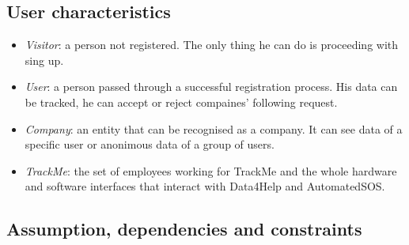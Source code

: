 \documentclass{article}
\begin{document}
\subsection{User characteristics}
\begin{itemize}
\item \emph{Visitor}: a person not registered. The only thing he can do is proceeding with sing up.
\item \emph{User}: a person passed through a successful registration process. His data can be tracked, he can accept or reject compaines' following request.
 \item \emph{Company}: an entity that can be recognised as a company. It can see data of a specific user or anonimous data of a group of users. 
 \item \emph{TrackMe}: the set of employees working for TrackMe and the whole hardware and software interfaces that interact with Data4Help and AutomatedSOS.
\end{itemize}
\subsection{Assumption, dependencies and constraints}
\end{document}
